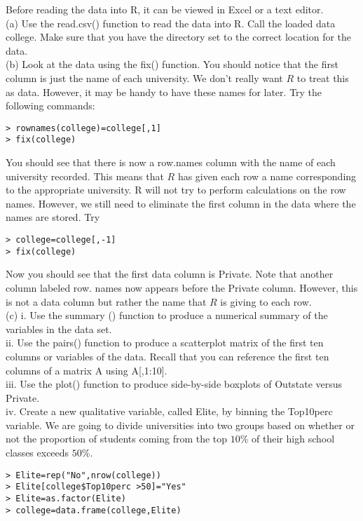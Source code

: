 \documentclass[10pt]{article}
\begin{document}
Before reading the data into R, it can be viewed in Excel or a text editor.\\
(a) Use the read.csv() function to read the data into R. Call the loaded data college. Make sure that you have the directory set to the correct location for the data.\\
(b) Look at the data using the fix() function. You should notice that the first column is just the name of each university. We don't really want $R$ to treat this as data. However, it may be handy to have these names for later. Try the following commands:


\begin{verbatim}
> rownames(college)=college[,1]
> fix(college)
\end{verbatim}

You should see that there is now a row.names column with the name of each university recorded. This means that $R$ has given each row a name corresponding to the appropriate university. R will not try to perform calculations on the row names. However, we still need to eliminate the first column in the data where the names are stored. Try

\begin{verbatim}
> college=college[,-1]
> fix(college)
\end{verbatim}

Now you should see that the first data column is Private. Note that another column labeled row. names now appears before the Private column. However, this is not a data column but rather the name that $R$ is giving to each row.\\
(c) i. Use the summary () function to produce a numerical summary of the variables in the data set.\\[0pt]
ii. Use the pairs() function to produce a scatterplot matrix of the first ten columns or variables of the data. Recall that you can reference the first ten columns of a matrix A using A[,1:10].\\
iii. Use the plot() function to produce side-by-side boxplots of Outstate versus Private.\\
iv. Create a new qualitative variable, called Elite, by binning the Top10perc variable. We are going to divide universities into two groups based on whether or not the proportion of students coming from the top $10 \%$ of their high school classes exceeds $50 \%$.

\begin{verbatim}
> Elite=rep("No",nrow(college))
> Elite[college$Top10perc >50]="Yes"
> Elite=as.factor(Elite)
> college=data.frame(college,Elite)
\end{verbatim}
\end{document}
